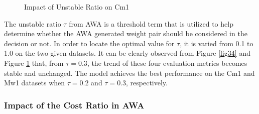 \begin{figure}[H]
\begin{minipage}{0.45\textwidth}
        \caption{Impact of Unstable Ratio on Cm1}
        \label{fig35}
    \end{minipage}
\end{figure}
The unstable ratio $\tau$ from AWA is a threshold term that is utilized to help determine whether the AWA generated weight pair should be considered in the decision or not. In order to locate the optimal value for $\tau$, it is varied from 0.1 to 1.0 on the two given datasets. It can be clearly observed from Figure \ref{fig34} and Figure \ref{fig35} that, from $\tau=0.3$, the trend of these four evaluation metrics becomes stable and unchanged. The model achieves the best performance on the Cm1 and Mw1 datasets when $\tau=0.2$ and $\tau=0.3$, respectively.

\subsubsection{Impact of the Cost Ratio in AWA}
